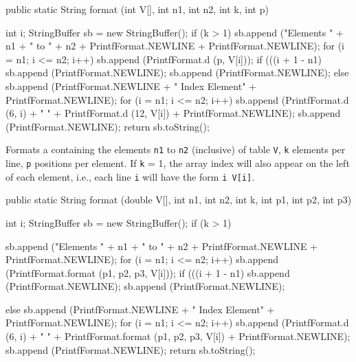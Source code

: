 \begin{code}

   public static String format (int V[], int n1, int n2, int k, int p)\begin{hide} {
      int i;
      StringBuffer sb = new StringBuffer();
      if (k > 1) {
         sb.append ("Elements  " + n1 + "  to  " + n2 +
                     PrintfFormat.NEWLINE + PrintfFormat.NEWLINE);
         for (i = n1; i <= n2; i++) {
            sb.append (PrintfFormat.d (p, V[i]));
            if (((i + 1 - n1) %
               sb.append (PrintfFormat.NEWLINE);
         }
         sb.append (PrintfFormat.NEWLINE);
      }
      else {
         sb.append (PrintfFormat.NEWLINE + " Index        Element" +
                    PrintfFormat.NEWLINE);
         for (i = n1; i <= n2; i++)
            sb.append (PrintfFormat.d (6, i) + "   " +
                      PrintfFormat.d (12, V[i]) + PrintfFormat.NEWLINE);
      }
      sb.append (PrintfFormat.NEWLINE);
      return sb.toString();
   }\end{hide}
\end{code}
 \begin{tabb}  Formats a  containing the elements \texttt{n1}
  to \texttt{n2} (inclusive) of table \texttt{V},
  \texttt{k} elements per line, \texttt{p} positions per element.
  If  \texttt{k} = 1, the array index will also appear on the left
  of each element, i.e., each line \texttt{i} will have the form \texttt{i V[i]}.
 \end{tabb}
\begin{htmlonly}
\end{htmlonly}
\begin{code}

   public static String format (double V[], int n1, int n2,
                                int k, int p1, int p2, int p3)\begin{hide} {
      int i;
      StringBuffer sb = new StringBuffer();
      if (k > 1) {
         sb.append ("Elements  " + n1 + "  to  " + n2  + 
                     PrintfFormat.NEWLINE + PrintfFormat.NEWLINE);
         for (i = n1; i <= n2; i++) {
            sb.append (PrintfFormat.format (p1, p2, p3, V[i]));
            if (((i + 1 - n1) %
               sb.append (PrintfFormat.NEWLINE);
         }
         sb.append (PrintfFormat.NEWLINE);

      } else {
         sb.append (PrintfFormat.NEWLINE + " Index            Element" +
                    PrintfFormat.NEWLINE);
         for (i = n1; i <= n2; i++)
            sb.append (PrintfFormat.d (6, i) + "   " +
                       PrintfFormat.format (p1, p2, p3, V[i]) +
                       PrintfFormat.NEWLINE);
      }
      sb.append (PrintfFormat.NEWLINE);
      return sb.toString();
   }\end{hide}
\end{code}
